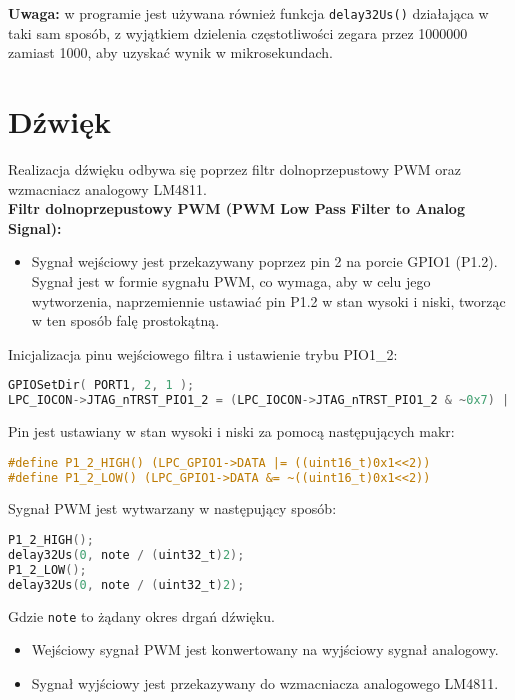\documentclass[a4paper,12pt]{report}
\begin{document}
\textbf{Uwaga:} w programie jest używana również funkcja \texttt{delay32Us()} działająca w taki sam sposób, z wyjątkiem dzielenia częstotliwości zegara przez 1000000 zamiast 1000, aby uzyskać wynik w mikrosekundach.

\section{Dźwięk}

Realizacja dźwięku odbywa się poprzez filtr dolnoprzepustowy PWM oraz wzmacniacz analogowy LM4811.\\

\textbf{Filtr dolnoprzepustowy PWM (PWM Low Pass Filter to Analog Signal):}
\begin{itemize}
    \item Sygnał wejściowy jest przekazywany poprzez pin 2 na porcie GPIO1 (P1.2). Sygnał jest w formie sygnału PWM, co wymaga, aby w celu jego wytworzenia, naprzemiennie ustawiać pin P1.2 w stan wysoki i niski, tworząc w ten sposób falę prostokątną.
\end{itemize}

Inicjalizacja pinu wejściowego filtra i ustawienie trybu PIO1\_2:
\begin{lstlisting}[language=C]
GPIOSetDir( PORT1, 2, 1 );
LPC_IOCON->JTAG_nTRST_PIO1_2 = (LPC_IOCON->JTAG_nTRST_PIO1_2 & ~0x7) | 0x01;
\end{lstlisting}

Pin jest ustawiany w stan wysoki i niski za pomocą następujących makr:
\begin{lstlisting}[language=C]
#define P1_2_HIGH() (LPC_GPIO1->DATA |= ((uint16_t)0x1<<2))
#define P1_2_LOW() (LPC_GPIO1->DATA &= ~((uint16_t)0x1<<2))
\end{lstlisting}

Sygnał PWM jest wytwarzany w następujący sposób:
\begin{lstlisting}[language=C]
P1_2_HIGH();
delay32Us(0, note / (uint32_t)2);
P1_2_LOW();
delay32Us(0, note / (uint32_t)2);
\end{lstlisting}

Gdzie \texttt{note} to żądany okres drgań dźwięku.
\begin{itemize}
    \item Wejściowy sygnał PWM jest konwertowany na wyjściowy sygnał analogowy.
    \item Sygnał wyjściowy jest przekazywany do wzmacniacza analogowego LM4811.
\end{itemize}
\end{document}
